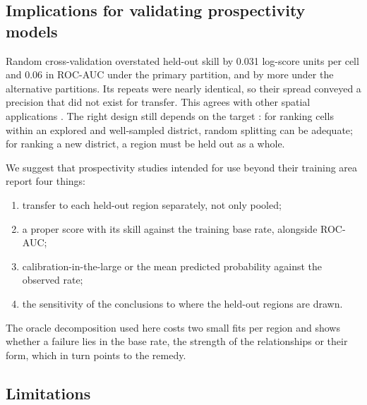 \documentclass[pdflatex,sn-basic]{sn-jnl}%
\begin{document}
\subsection{Implications for validating prospectivity models}

Random cross-validation overstated held-out skill by 0.031 log-score units per cell and 0.06 in ROC-AUC under the primary partition, and by more under the alternative partitions. Its repeats were nearly identical, so their spread conveyed a precision that did not exist for transfer. This agrees with other spatial applications \citep{Roberts2017, Ploton2020}. The right design still depends on the target \citep{Wadoux2021}: for ranking cells within an explored and well-sampled district, random splitting can be adequate; for ranking a new district, a region must be held out as a whole.

We suggest that prospectivity studies intended for use beyond their training area report four things:
\begin{enumerate}
\item transfer to each held-out region separately, not only pooled;
\item a proper score with its skill against the training base rate, alongside ROC-AUC;
\item calibration-in-the-large or the mean predicted probability against the observed rate;
\item the sensitivity of the conclusions to where the held-out regions are drawn.
\end{enumerate}
The oracle decomposition used here costs two small fits per region and shows whether a failure lies in the base rate, the strength of the relationships or their form, which in turn points to the remedy.

\subsection{Limitations}
\label{sec:limitations}
\end{document}
